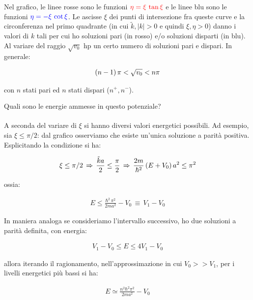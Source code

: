 \begin{minipage}{0.5\textwidth}

	Nel grafico, le linee rosse sono le funzioni $\textcolor{red}{\eta = \xi \, \tan\xi}$ e le linee blu sono le funzioni $\textcolor{blue}{\eta = - \xi \, \cot\xi}$. Le ascisse $\xi$ dei punti di intersezione fra queste curve e la circonferenza nel primo quadrante (in cui $\tilde{k}, |k| > 0$ e quindi $\xi, \eta > 0$) danno i valori di $k$ tali per cui ho soluzioni pari (in rosso) e/o soluzioni disparti (in blu). Al variare del raggio $\sqrt{v_0}$ hp un certo numero di soluzioni pari e dispari. In generale:
	
\begin{align*}
	\qty(n-1)\,\pi < \sqrt{v_0} < n\pi 
\end{align*}

	con $n$ stati pari ed $n$ stati dispari ($n^+, n^-$).
	
\end{minipage}
\vspace{1em}
	
	Quali sono le energie ammesse in questo potenziale?
	\\
	\\
	A seconda del variare di $\xi$ si hanno diversi valori energetici possibili. Ad esempio, sia $\xi \leq \pi/2$: dal grafico osserviamo che esiste un'unica soluzione a parità positiva. Esplicitando la condizione si ha:
	
\begin{align*}
	\xi \leq \pi/2 \, \Rightarrow \, \frac{\tilde{k}a}{2} \leq \frac{\pi}{2} \, \Rightarrow \, \frac{2m}{\hbar^2} \, \qty(E + V_0) \, a^2 \leq \pi^2
\end{align*}

	ossia:
	
\begin{align*}
	E \leq \frac{\hbar^2 \, \pi^2}{2ma^2} - V_0 \, \equiv \, V_1 - V_0
\end{align*}

	In maniera analoga se consideriamo l'intervallo successivo, ho due soluzioni a parità definita, con energia:
	
\begin{align*}
	V_1 - V_0 \leq E \leq 4V_1 - V_0
\end{align*}

	allora iterando il ragionamento, nell'approssimazione in cui $V_0 >> V_1$, per i livelli energetici più bassi si ha:
	
\begin{align*}
	E \simeq \frac{n^2 \hbar^2 \pi^2}{2ma^2} - V_0
\end{align*}

